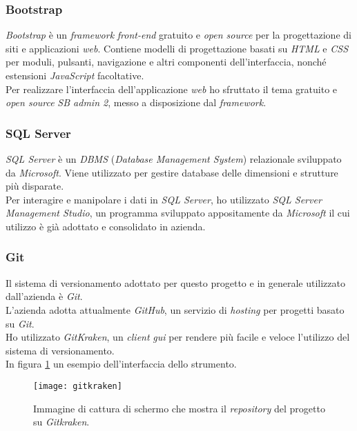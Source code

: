 \subsubsection{Bootstrap}
\textit{Bootstrap} è un \textit{framework} \textit{front-end} gratuito e \textit{open source} per la progettazione di siti e applicazioni \textit{web}. Contiene modelli di progettazione basati su \textit{HTML} e \textit{CSS} per moduli, pulsanti, navigazione e altri componenti dell'interfaccia, nonché estensioni \textit{JavaScript} facoltative.\\
Per realizzare l'interfaccia dell'applicazione \textit{web} ho sfruttato il tema gratuito e \textit{open source} \textit{SB admin 2}, messo a disposizione dal \textit{framework}.

\subsubsection{SQL Server}
\textit{SQL Server} è un \textit{DBMS} (\textit{Database Management System}) relazionale sviluppato da \textit{Microsoft}. Viene utilizzato per gestire database delle dimensioni e strutture più disparate.\\
Per interagire e manipolare i dati in \textit{SQL Server}, ho utilizzato \textit{SQL Server Management Studio}, un programma sviluppato appositamente da \textit{Microsoft} il cui utilizzo è già adottato e consolidato in azienda.

\subsubsection{Git}
Il sistema di versionamento adottato per questo progetto e in generale utilizzato dall'azienda è \textit{Git}.\\
L'azienda adotta attualmente \textit{GitHub}, un servizio di \textit{hosting} per progetti basato su \textit{Git}.\\
Ho utilizzato \textit{GitKraken}, un \textit{client} \textit{\gls{gui}} per rendere più facile e veloce l'utilizzo del sistema di versionamento.\\
In figura \ref{fig:gitkraken} un esempio dell'interfaccia dello strumento.

\begin{figure}[htbp]
	\begin{center}
		\texttt{[image: gitkraken]}
		\caption{Immagine di cattura di schermo che mostra il \textit{repository} del progetto su \textit{Gitkraken}.}
		\label{fig:gitkraken}
	\end{center}
\end{figure}


